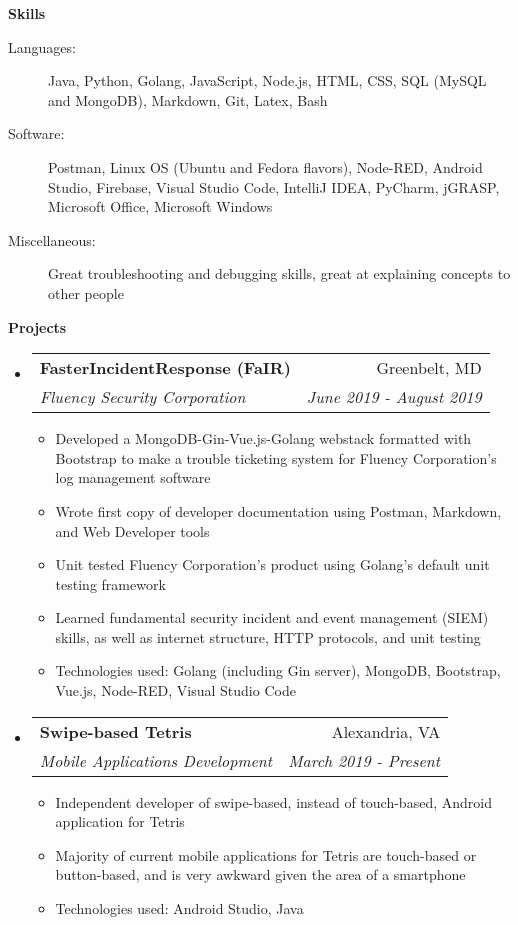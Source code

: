 \documentclass[letterpaper,11pt]{article}
\makeatletter
\newcommand{\resitem}[1]{\item #1 \vspace{-2pt}}
\newcommand{\resheading}[1]{{\large \colorbox{mygrey}{\begin{minipage}{\textwidth}{\textbf{#1 \vphantom{p\^{E}}}}\end{minipage}}}}
\newcommand{\ressubheading}[4]{
\begin{tabular*}{7.0in}{l@{\extracolsep{\fill}}r}
		\textbf{#1} & #2 \\
		\textit{#3} & \textit{#4} \\
\end{tabular*}\vspace{-6pt}}
\makeatother
\begin{document}
\resheading{Skills}

\begin{description}
\item[Languages:]
Java, Python, Golang, JavaScript, Node.js, HTML, CSS, SQL (MySQL and MongoDB), Markdown, Git, Latex, Bash
\item[Software:]
Postman, Linux OS (Ubuntu and Fedora flavors), Node-RED, Android Studio, Firebase, Visual Studio Code, IntelliJ IDEA, PyCharm, jGRASP, Microsoft Office, Microsoft Windows
\item[Miscellaneous:]
Great troubleshooting and debugging skills, great at explaining concepts to other people
\end{description}

\resheading{Projects}

\begin{itemize}
\item
    \ressubheading{FasterIncidentResponse (FaIR)}{Greenbelt, MD}{Fluency Security Corporation}{June 2019 - August 2019}
	\begin{itemize}
		\resitem{Developed a MongoDB-Gin-Vue.js-Golang webstack formatted with Bootstrap to make a trouble ticketing system for Fluency Corporation's log management software}
		\resitem{Wrote first copy of developer documentation using Postman, Markdown, and Web Developer tools}
		\resitem{Unit tested Fluency Corporation's product using Golang's default unit testing framework}
		\resitem{Learned fundamental security incident and event management (SIEM) skills, as well as internet structure, HTTP protocols, and unit testing}
		\resitem{Technologies used: Golang (including Gin server), MongoDB, Bootstrap, Vue.js, Node-RED, Visual Studio Code}
	\end{itemize}
\item
    \ressubheading{Swipe-based Tetris}{Alexandria, VA}{Mobile Applications Development}{March 2019 - Present}
	\begin{itemize}
		\resitem{Independent developer of swipe-based, instead of touch-based, Android application for Tetris}
		\resitem{Majority of current mobile applications for Tetris are touch-based or button-based, and is very awkward given the area of a smartphone}
		\resitem{Technologies used: Android Studio, Java}
	\end{itemize}

\end{itemize}
\end{document}
